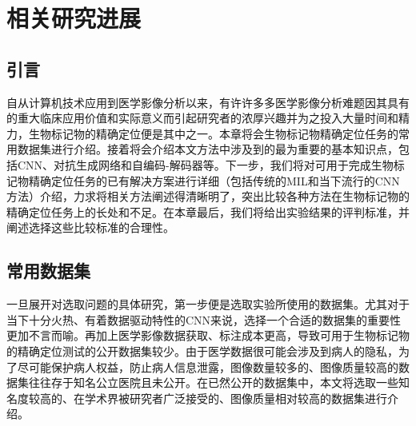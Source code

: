 \chapter{相关研究进展}
\section{引言}
自从计算机技术应用到医学影像分析以来，有许许多多医学影像分析难题因其具有的重大临床应用价值和实际意义而引起研究者的浓厚兴趣并为之投入大量时间和精力，生物标记物的精确定位便是其中之一。本章将会生物标记物精确定位任务的常用数据集进行介绍。接着将会介绍本文方法中涉及到的最为重要的基本知识点，包括CNN、对抗生成网络和自编码-解码器等。下一步，我们将对可用于完成生物标记物精确定位任务的已有解决方案进行详细（包括传统的MIL和当下流行的CNN方法）介绍，力求将相关方法阐述得清晰明了，突出比较各种方法在生物标记物的精确定位任务上的长处和不足。在本章最后，我们将给出实验结果的评判标准，并阐述选择这些比较标准的合理性。

\section{常用数据集}
一旦展开对选取问题的具体研究，第一步便是选取实验所使用的数据集。尤其对于当下十分火热、有着数据驱动特性的CNN来说，选择一个合适的数据集的重要性更加不言而喻。再加上医学影像数据获取、标注成本更高，导致可用于生物标记物的精确定位测试的公开数据集较少。由于医学数据很可能会涉及到病人的隐私，为了尽可能保护病人权益，防止病人信息泄露，图像数量较多的、图像质量较高的数据集往往存于知名公立医院且未公开。在已然公开的数据集中，本文将选取一些知名度较高的、在学术界被研究者广泛接受的、图像质量相对较高的数据集进行介绍。

